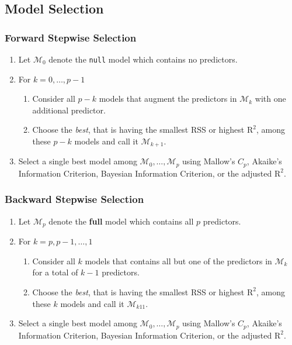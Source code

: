 \documentclass[11pt]{article}
\begin{document}
\subsection{Model Selection}
\subsubsection{Forward Stepwise Selection}
\begin{enumerate}
	\item Let $\mathcal{M}_0$ denote the \texttt{null} model which contains no predictors.
	\item For $k = 0,\dots,p-1$
	\begin{enumerate}
		\item Consider all $p - k$ models that augment the predictors in $\mathcal{M}_k$ with one additional predictor.
		\item Choose the \emph{best}, that is having the smallest RSS or highest $\text{R}^2$, among these $p-k$ models and call it $\mathcal{M}_{k+1}$.
	\end{enumerate}
	\item Select a single best model among $\mathcal{M}_0,\dots, \mathcal{M}_p$ using Mallow's $C_p$, Akaike's Information Criterion, Bayesian Information Criterion, or the adjusted $\text{R}^2$.
\end{enumerate}

\subsubsection{Backward Stepwise Selection}
\begin{enumerate}
	\item Let $\mathcal{M}_p$ denote the \textbf{full} model which contains all $p$ predictors.
	\item For $k = p, p-1, \dots, 1$
	\begin{enumerate}
		\item Consider all $k$ models that contains all but one of the predictors in $\mathcal{M}_k$ for a total of $k-1$ predictors.
		\item Choose the \emph{best}, that is having the smallest RSS or highest $\text{R}^2$, among these $k$ models and call it $\mathcal{M}_{k11}$.
	\end{enumerate}
	\item Select a single best model among $\mathcal{M}_0,\dots, \mathcal{M}_p$ using Mallow's $C_p$, Akaike's Information Criterion, Bayesian Information Criterion, or the adjusted $\text{R}^2$.
\end{enumerate}
\end{document}
